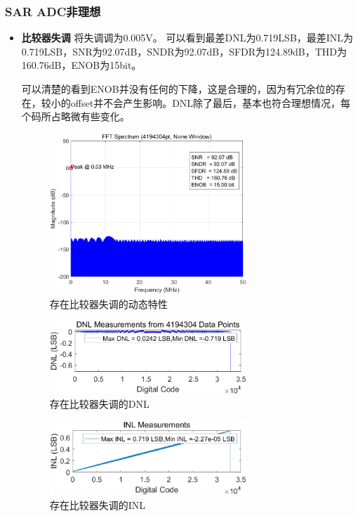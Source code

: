 \documentclass[cs4size,a4paper]{ctexart}
\numberwithin{equation}{section}
\numberwithin{table}{section}
\numberwithin{figure}{section}
\begin{document}
\subsubsection{SAR ADC非理想}
	\begin{itemize}
		\item \textbf{比较器失调} 将失调调为0.005V。
		可以看到最差DNL为0.719LSB，最差INL为0.719LSB，SNR为92.07dB，SNDR为92.07dB，SFDR为124.89dB，THD为160.76dB，ENOB为15bit。
		
		可以清楚的看到ENOB并没有任何的下降，这是合理的，因为有冗余位的存在，较小的offset并不会产生影响。DNL除了最后，基本也符合理想情况，每个码所占略微有些变化。
		\begin{figure}[H]
			\centering
			\includegraphics[width=0.7\textwidth]{pic/Comno/DFT.png}
			\caption{存在比较器失调的动态特性} 
		\end{figure}

		\begin{figure}[H]
			\centering
			\includegraphics[width=0.7\textwidth]{pic/Comno/DNL.png}
			\caption{存在比较器失调的DNL} 
		\end{figure}

		\begin{figure}[H]
			\centering
			\includegraphics[width=0.7\textwidth]{pic/Comno/INL.png}
			\caption{存在比较器失调的INL} 
		\end{figure}


\end{itemize}
\end{document}
